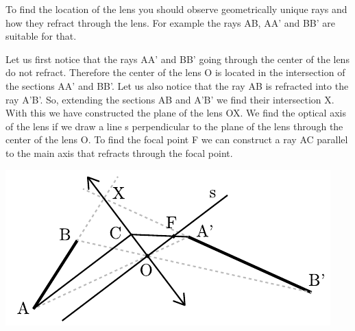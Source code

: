 {\ifEngHint
To find the location of the lens you should observe geometrically unique rays and how they refract through the lens. For example the rays AB, AA’ and BB’ are suitable for that.
\fi


\ifEngSolution
Let us first notice that the rays AA’ and BB’ going through the center of the lens do not refract. Therefore the center of the lens O is located in the intersection of the sections AA’ and BB’. Let us also notice that the ray AB is refracted into the ray A’B’. So, extending the sections AB and A’B’ we find their intersection X. With this we have constructed the plane of the lens OX. We find the optical axis of the lens if we draw a line s perpendicular to the plane of the lens through the center of the lens O. To find the focal point F we can construct a ray AC parallel to the main axis that refracts through the focal point. 
\begin{center}
\includegraphics[width=\textwidth]{2015-lahg-05-laatsLahendus}
\end{center}
\fi
}